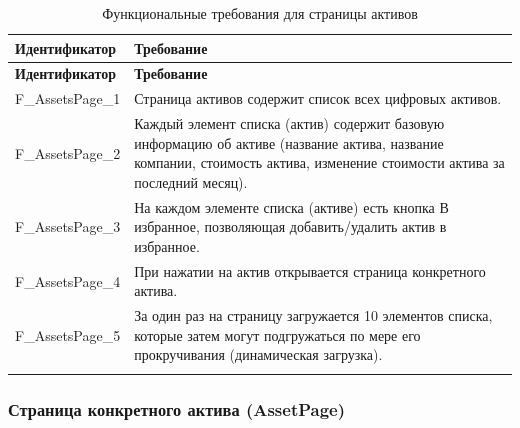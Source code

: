 \documentclass[a4paper, 14pt]{article}
\begin{document}
\begin{longtable}{| p{} | p{} |}
    \hline
    \textbf{Идентификатор}          & \textbf{Требование}                                                                                                                                                                \\
    \hline
    \endfirsthead
    \hline
    \textbf{Идентификатор}          & \textbf{Требование}                                                                                                                                                                \\
    \hline
    \endhead

    F\_AssetsPage\_1                & Страница активов содержит список всех цифровых активов.                                                                                                                            \\ \hline
    F\_AssetsPage\_2                & Каждый элемент списка (актив) содержит базовую информацию об активе (название актива, название компании, стоимость актива, изменение стоимости актива за последний месяц).                                                        \\ \hline
    F\_AssetsPage\_3                & На каждом элементе списка (активе) есть кнопка В избранное, позволяющая добавить/удалить актив в избранное.                                                                        \\ \hline
    F\_AssetsPage\_4                & При нажатии на актив открывается страница конкретного актива.                                                                                                                      \\ \hline
    F\_AssetsPage\_5                & За один раз на страницу загружается 10 элементов списка, которые затем могут подгружаться по мере его прокручивания (динамическая загрузка).                                       \\ \hline

    \caption{Функциональные требования для страницы активов}
\end{longtable}

\subsubsection{Страница конкретного актива (AssetPage)}
\end{document}
